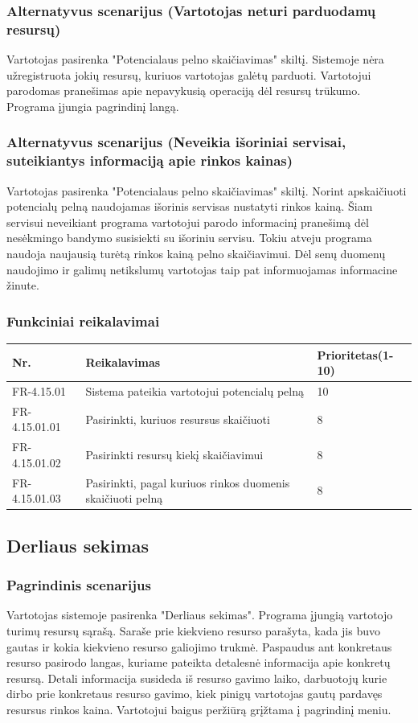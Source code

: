 \documentclass[oneside]{VUMIFPSkursinis}
\begin{document}
	\subsubsection{Alternatyvus scenarijus (Vartotojas neturi parduodamų resursų)}
	Vartotojas pasirenka "Potencialaus pelno skaičiavimas" skiltį. Sistemoje nėra užregistruota jokių resursų, kuriuos vartotojas galėtų parduoti. Vartotojui parodomas pranešimas apie nepavykusią operaciją dėl resursų trūkumo. Programa įjungia pagrindinį langą. 
	\subsubsection{Alternatyvus scenarijus (Neveikia išoriniai servisai, suteikiantys informaciją apie rinkos kainas)}
	Vartotojas pasirenka "Potencialaus pelno skaičiavimas" skiltį. Norint apskaičiuoti potencialų pelną naudojamas išorinis servisas nustatyti rinkos kainą. Šiam servisui neveikiant programa vartotojui parodo informacinį pranešimą dėl nesėkmingo bandymo susisiekti su išoriniu servisu. Tokiu atveju programa naudoja naujausią turėtą rinkos kainą pelno skaičiavimui. Dėl senų duomenų naudojimo ir galimų netikslumų vartotojas taip pat informuojamas informacine žinute.
	\subsubsection{Funkciniai reikalavimai}
\begin{table}[htbp]
	\begin{tabularx}{1\textwidth}{ |P{2.5cm}|X|P{3cm }| }  \hline
		Nr. & Reikalavimas & Prioritetas(1-10) \\ \hline
		FR-4.15.01 & Sistema pateikia vartotojui potencialų pelną & 10 \\ \hline
		FR-4.15.01.01 & Pasirinkti, kuriuos resursus skaičiuoti & 8 \\ \hline
		FR-4.15.01.02 & Pasirinkti resursų kiekį skaičiavimui & 8 \\ \hline
		FR-4.15.01.03 & Pasirinkti, pagal kuriuos rinkos duomenis skaičiuoti pelną & 8 \\ \hline
	\end{tabularx}
\end{table}	
\subsection{Derliaus sekimas}
	\subsubsection{Pagrindinis scenarijus}
	Vartotojas sistemoje pasirenka "Derliaus sekimas". Programa įjungią vartotojo turimų resursų sąrašą. Saraše prie kiekvieno resurso parašyta, kada jis buvo gautas ir kokia kiekvieno resurso galiojimo trukmė. Paspaudus ant konkretaus resurso pasirodo langas, kuriame pateikta detalesnė informacija apie konkretų resursą. Detali informacija susideda iš resurso gavimo laiko, darbuotojų kurie dirbo prie konkretaus resurso gavimo, kiek pinigų vartotojas gautų pardavęs resursus rinkos kaina. Vartotojui baigus peržiūrą grįžtama į pagrindinį meniu.
\end{document}
